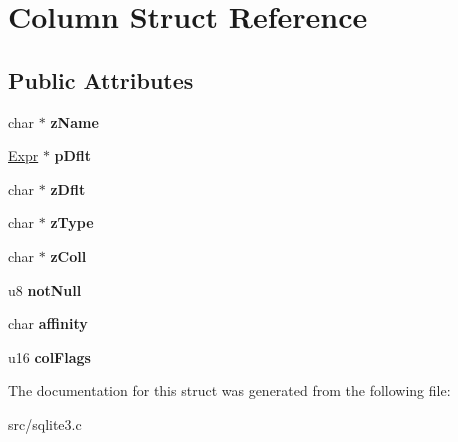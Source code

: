 \hypertarget{struct_column}{\section{Column Struct Reference}
\label{struct_column}
}
\subsection*{Public Attributes}
\begin{DoxyCompactItemize}
\item 
\hypertarget{struct_column_a6450a4e9fde68b3a2d79425d826eccc3}{char $\ast$ {\bfseries z\-Name}}\label{struct_column_a6450a4e9fde68b3a2d79425d826eccc3}

\item 
\hypertarget{struct_column_ac4178f302df70048235660979f84ffe4}{\hyperlink{struct_expr}{Expr} $\ast$ {\bfseries p\-Dflt}}\label{struct_column_ac4178f302df70048235660979f84ffe4}

\item 
\hypertarget{struct_column_a88d29c685783cddfbd039e5674990f4b}{char $\ast$ {\bfseries z\-Dflt}}\label{struct_column_a88d29c685783cddfbd039e5674990f4b}

\item 
\hypertarget{struct_column_aef09f43479c4bd2d07f77d340020f95f}{char $\ast$ {\bfseries z\-Type}}\label{struct_column_aef09f43479c4bd2d07f77d340020f95f}

\item 
\hypertarget{struct_column_aa95909d5c77b321258622ed28d7b96eb}{char $\ast$ {\bfseries z\-Coll}}\label{struct_column_aa95909d5c77b321258622ed28d7b96eb}

\item 
\hypertarget{struct_column_a852e9a4c1c327a64d9b051dcafda3841}{u8 {\bfseries not\-Null}}\label{struct_column_a852e9a4c1c327a64d9b051dcafda3841}

\item 
\hypertarget{struct_column_ac9d6fe31c45888cecaf3f5ad5b93bf23}{char {\bfseries affinity}}\label{struct_column_ac9d6fe31c45888cecaf3f5ad5b93bf23}

\item 
\hypertarget{struct_column_abd0c79e6f531abfb54b1296ed9a72093}{u16 {\bfseries col\-Flags}}\label{struct_column_abd0c79e6f531abfb54b1296ed9a72093}

\end{DoxyCompactItemize}


The documentation for this struct was generated from the following file\-:\begin{DoxyCompactItemize}
\item 
src/sqlite3.\-c\end{DoxyCompactItemize}
